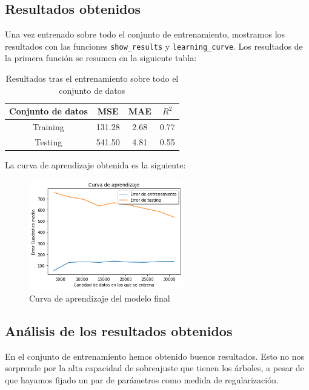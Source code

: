 \documentclass[11pt]{article}
\begin{document}
\subsection{Resultados obtenidos}

Una vez entrenado sobre todo el conjunto de entrenamiento, mostramos los resultados con las funciones \lstinline{show_results} y \lstinline{learning_curve}. Los resultados de la primera función se resumen en la siguiente tabla:

\begin{table}[H]
    \centering
    \begin{tabular}{|c|c|c|c|}
    \hline
    \textbf{Conjunto de datos}  & \textbf{MSE} & \textbf{MAE} & \textbf{$R^2$} \\
    \hline
    Training & 131.28  & 2.68 & 0.77 \\
    Testing  & 541.50  & 4.81 & 0.55 \\
    \hline
    \end{tabular}
    \caption{Resultados tras el entrenamiento sobre todo el conjunto de datos}
\end{table}

La curva de aprendizaje obtenida es la siguiente:

\begin{figure}[H]
  \centering
  \includegraphics[width=0.6\textwidth]{curva_aprendizaje}
  \caption{Curva de aprendizaje del modelo final}
\end{figure}

\subsection{Análisis de los resultados obtenidos}

En el conjunto de entrenamiento hemos obtenido buenos resultados. Esto no nos sorprende por la alta capacidad de sobreajuste que tienen los árboles, a pesar de que hayamos fijado un par de parámetros como medida de regularización.
\end{document}
